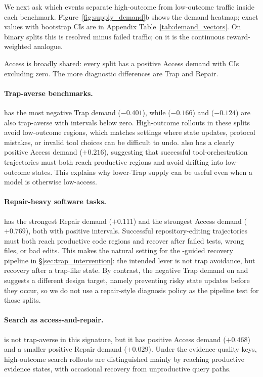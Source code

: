 We next ask which events separate high-outcome from low-outcome traffic inside each benchmark.
Figure~\ref{fig:supply_demand}b shows the demand heatmap; exact values with bootstrap CIs are in Appendix Table~\ref{tab:demand_vectors}.
On binary splits this is resolved minus failed traffic; on \mcp{} it is the continuous reward-weighted analogue.

Access is broadly shared: every split has a positive Access demand with CIs excluding zero.
The more diagnostic differences are Trap and Repair.

\paragraph{Trap-averse benchmarks.}
\taub{} has the most negative Trap demand ($-0.401$), while \mcp{} ($-0.166$) and \terminal{} ($-0.124$) are also trap-averse with intervals below zero.
High-outcome rollouts in these splits avoid low-outcome regions, which matches settings where state updates, protocol mistakes, or invalid tool choices can be difficult to undo.
\mcp{} also has a clearly positive Access demand ($+0.216$), suggesting that successful tool-orchestration trajectories must both reach productive regions and avoid drifting into low-outcome states.
This explains why lower-Trap supply can be useful even when a model is otherwise low-access.

\paragraph{Repair-heavy software tasks.}
\swe{} has the strongest Repair demand ($+0.111$) and the strongest Access demand ($+0.769$), both with positive intervals.
Successful repository-editing trajectories must both reach productive code regions and recover after failed tests, wrong files, or bad edits.
This makes \swe{} the natural setting for the \method{}-guided recovery pipeline in \S\ref{sec:trap_intervention}: the intended lever is not trap avoidance, but recovery after a trap-like state.
By contrast, the negative Trap demand on \taub{} and \mcp{} suggests a different design target, namely preventing risky state updates before they occur, so we do not use a repair-style diagnosis policy as the pipeline test for those splits.

\paragraph{Search as access-and-repair.}
\searchb{} is not trap-averse in this signature, but it has positive Access demand ($+0.468$) and a smaller positive Repair demand ($+0.029$).
Under the evidence-quality keys, high-outcome search rollouts are distinguished mainly by reaching productive evidence states, with occasional recovery from unproductive query paths.

